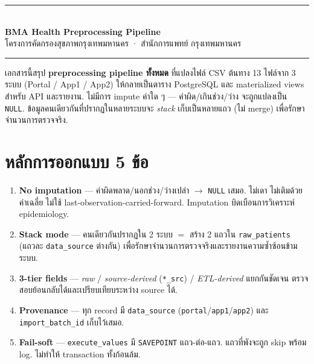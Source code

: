 \documentclass[11pt,a4paper]{article}
\begin{document}
\begin{center}
  \vspace*{-0.6cm}
  \textcolor{bmagreen}{\rule{\linewidth}{1.2pt}}\\[2pt]
  {\Large\bfseries\color{bmagreen} BMA Health Preprocessing Pipeline}\\[2pt]
  {\small\color{gray} โครงการคัดกรองสุขภาพกรุงเทพมหานคร · สำนักการแพทย์ กรุงเทพมหานคร}\\[2pt]
  \textcolor{bmagreen}{\rule{\linewidth}{1.2pt}}
\end{center}

\vspace{0.3cm}

\noindent
เอกสารนี้สรุป \textbf{preprocessing pipeline ทั้งหมด} ที่แปลงไฟล์ CSV ต้นทาง 13 ไฟล์จาก 3 ระบบ
(Portal / App1 / App2) ให้กลายเป็นตาราง PostgreSQL และ materialized views สำหรับ API และรายงาน.
ไม่มีการ impute ค่าใด ๆ — ค่าผิด/เกินช่วง/ว่าง จะถูกแปลงเป็น \texttt{NULL}.
ข้อมูลคนเดียวกันที่ปรากฏในหลายระบบจะ \textit{stack} เก็บเป็นหลายแถว (ไม่ merge) เพื่อรักษาจำนวนการตรวจจริง.

\tableofcontents
\vspace{0.5cm}

\section{หลักการออกแบบ 5 ข้อ}

\begin{enumerate}[leftmargin=*, itemsep=3pt]
  \item \textbf{No imputation} --- ค่าผิดพลาด/นอกช่วง/ว่างเปล่า $\rightarrow$ \texttt{NULL} เสมอ.
    ไม่เดา ไม่เติมด้วยค่าเฉลี่ย ไม่ใช้ last-observation-carried-forward.
    Imputation บิดเบือนการวิเคราะห์ epidemiology.
  \item \textbf{Stack mode} --- คนเดียวกันปรากฏใน 2 ระบบ $=$ สร้าง 2 แถวใน \texttt{raw\_patients}
    (แถวละ \texttt{data\_source} ต่างกัน) เพื่อรักษาจำนวนการตรวจจริงและรายงานความซ้ำซ้อนข้ามระบบ.
  \item \textbf{3-tier fields} --- \textit{raw} / \textit{source-derived} (\texttt{*\_src}) / \textit{ETL-derived}
    แยกกันชัดเจน ตรวจสอบย้อนกลับได้และเปรียบเทียบระหว่าง source ได้.
  \item \textbf{Provenance} --- ทุก record มี \texttt{data\_source} (\texttt{portal}/\texttt{app1}/\texttt{app2})
    และ \texttt{import\_batch\_id} เก็บไว้เสมอ.
  \item \textbf{Fail-soft} --- \texttt{execute\_values} มี \texttt{SAVEPOINT} แถว-ต่อ-แถว.
    แถวที่พังจะถูก skip พร้อม log. ไม่ทำให้ transaction ทั้งก้อนล้ม.
\end{enumerate}
\end{document}
